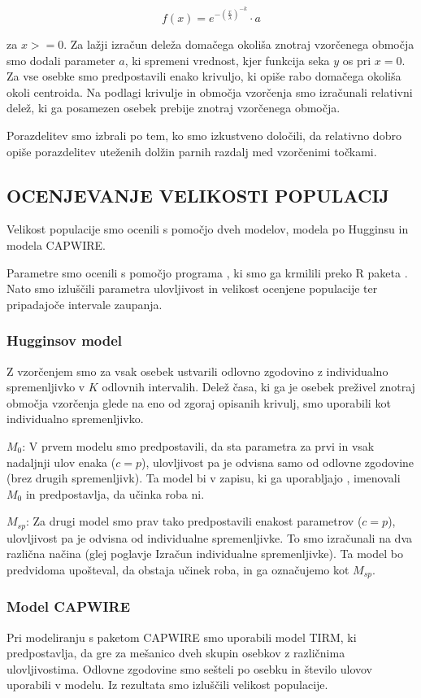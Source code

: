 \[
f(x) = e^{-(\frac{x}{\lambda})^{-k}}  \cdot a
\]

za $x >= 0$. Za lažji izračun deleža domačega okoliša znotraj vzorčenega območja smo dodali parameter $a$, ki spremeni vrednost, kjer funkcija seka $y$ os pri $x = 0$.
Za vse osebke smo predpostavili enako krivuljo, ki opiše rabo domačega okoliša okoli centroida. Na podlagi krivulje in območja vzorčenja smo izračunali relativni delež, ki ga posamezen osebek prebije znotraj vzorčenega območja.

Porazdelitev smo izbrali po tem, ko smo izkustveno določili, da relativno dobro opiše porazdelitev uteženih dolžin parnih razdalj med vzorčenimi točkami.


\subsection{OCENJEVANJE VELIKOSTI POPULACIJ}
Velikost populacije smo ocenili s pomočjo dveh modelov, modela po Hugginsu in modela CAPWIRE.

Parametre smo ocenili s pomočjo programa  \citep{cooch_program_2012}, ki smo ga krmilili preko R paketa  \citep{laake_2013}. Nato smo izluščili parametra ulovljivost in velikost ocenjene populacije ter pripadajoče intervale zaupanja.

\subsubsection[\bfseries Hugginsov model]{Hugginsov model}
Z vzorčenjem smo za vsak osebek ustvarili odlovno zgodovino z individualno spremenljivko v $K$ odlovnih intervalih. Delež časa, ki ga je osebek preživel znotraj območja vzorčenja glede na eno od zgoraj opisanih krivulj, smo uporabili kot individualno spremenljivko.

$M_0$: V prvem modelu smo predpostavili, da sta parametra za prvi in vsak nadaljnji ulov enaka ($c = p$), ulovljivost pa je odvisna samo od odlovne zgodovine (brez drugih spremenljivk). Ta model bi v zapisu, ki ga uporabljajo \citep{otis_statistical_1978}, imenovali $M_0$ in predpostavlja, da učinka roba ni.

$M_{sp}$: Za drugi model smo prav tako predpostavili enakost parametrov ($c=p$), ulovljivost pa je odvisna od individualne spremenljivke. To smo izračunali na dva različna načina (glej poglavje Izračun individualne spremenljivke). Ta model bo predvidoma upošteval, da obstaja učinek roba, in ga označujemo kot $M_{sp}$.

\subsubsection[\bfseries Model CAPWIRE]{Model CAPWIRE}
Pri modeliranju s paketom CAPWIRE \citep{pennell_miller_2012} smo uporabili model TIRM, ki predpostavlja, da gre za mešanico dveh skupin osebkov z različnima ulovljivostima. Odlovne zgodovine smo sešteli po osebku in število ulovov uporabili v modelu. Iz rezultata smo izluščili velikost populacije.

